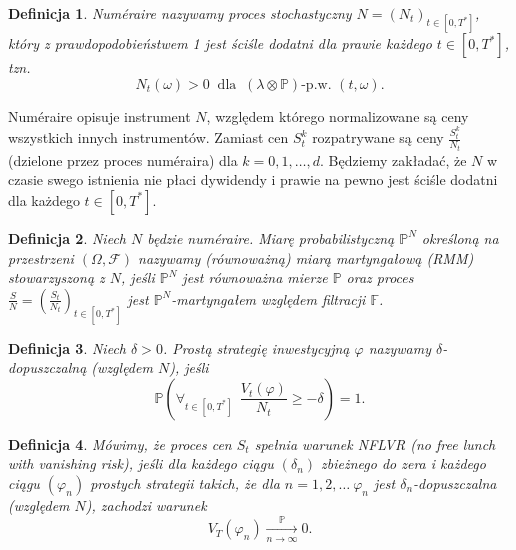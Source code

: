 \documentclass{mini}
\theoremstyle{mythstyle}
\newtheorem{Definicja}{Definicja}[chapter]
\begin{document}
\begin{Definicja}
	Num\'{e}raire nazywamy proces stochastyczny $N=(N_t)_{t\in [0,T^*]}$, który z prawdopodobieństwem 1 jest ściśle dodatni dla prawie każdego $t\in [0,T^*]$, tzn. \[ N_t(\omega) >0 \ \text{   dla }  \ (\lambda \otimes\mathbb{P})\text{-p.w. } (t,\omega). \]
\end{Definicja}
Num\'{e}raire opisuje instrument $N$, względem którego normalizowane są ceny wszystkich innych instrumentów. Zamiast cen $S_t^k$ rozpatrywane są ceny $\frac{S_t^k}{N_t}$ (dzielone przez proces num\'{e}raira) dla $k=0,1,\ldots,d$. Będziemy zakładać, że $N$ w czasie swego istnienia nie płaci dywidendy i prawie na pewno jest ściśle dodatni dla każdego $t\in [0,T^*]$.\\
\begin{Definicja}
	Niech $N$ będzie num\'{e}raire. Miarę probabilistyczną $\mathbb{P}^N$ określoną na przestrzeni $(\Omega,\mathcal{F})$ nazywamy (równoważną) miarą martyngałową (RMM) stowarzyszoną z $N$, jeśli $\mathbb{P}^N$ jest równoważna mierze $\mathbb{P}$ oraz proces $\frac{S}{N}=(\frac{S_t}{N_t})_{t\in [0,T^*]}$ jest $\mathbb{P}^N$-martyngałem względem filtracji $\mathbb{F}$.\\
\end{Definicja}
\begin{Definicja}
	Niech $\delta>0$. Prostą strategię inwestycyjną $\varphi$ nazywamy $\delta$-dopuszczalną (względem $N$), jeśli \[ \mathbb{P}\left(\forall_{t\in [0,T^*]} \ \ \frac{V_t(\varphi)}{N_t}\geq -\delta \right) = 1. \]
\end{Definicja}

\begin{Definicja}
	Mówimy, że proces cen $S_t$ spełnia warunek NFLVR (no free lunch with vanishing risk), jeśli dla każdego ciągu $(\delta_n)$ zbieżnego do zera i każdego ciągu $(\varphi_n)$ prostych strategii takich, że 	dla $n=1,2,\ldots \ \varphi_n$ jest $\delta_n$-dopuszczalna (względem $N$), zachodzi warunek \[ V_T(\varphi_n)\xrightarrow[n\rightarrow
	\infty]{\mathbb{P}}0. \]
\end{Definicja}
\end{document}
